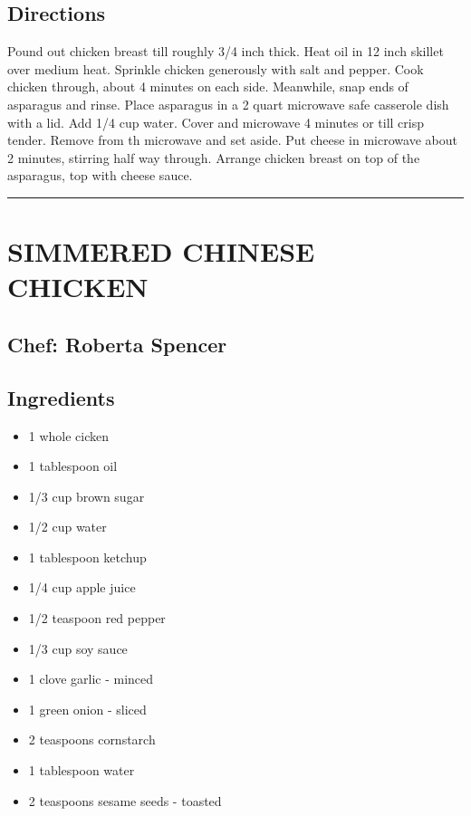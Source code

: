 \documentclass[
]{book}
\providecommand{\tightlist}{%
  \setlength{\itemsep}{0pt}\setlength{\parskip}{0pt}}
\begin{document}
\hypertarget{directions-64}{%
\subsection*{Directions}\label{directions-64}}


Pound out chicken breast till roughly 3/4 inch thick. Heat oil in 12 inch skillet over medium heat. Sprinkle chicken generously with salt and pepper. Cook chicken through, about 4 minutes on each side. Meanwhile, snap ends of asparagus and rinse. Place asparagus in a 2 quart microwave safe casserole dish with a lid. Add 1/4 cup water. Cover and microwave 4 minutes or till crisp tender. Remove from th microwave and set aside. Put cheese in microwave about 2 minutes, stirring half way through. Arrange chicken breast on top of the asparagus, top with cheese sauce.

\begin{center}\rule{0.5\linewidth}{0.5pt}\end{center}

\hypertarget{simmered-chinese-chicken}{%
\section*{SIMMERED CHINESE CHICKEN}\label{simmered-chinese-chicken}}


\hypertarget{chef-roberta-spencer-22}{%
\subsection*{Chef: Roberta Spencer}\label{chef-roberta-spencer-22}}


\hypertarget{ingredients-65}{%
\subsection*{Ingredients}\label{ingredients-65}}


\begin{itemize}
\tightlist
\item
  1 whole cicken
\item
  1 tablespoon oil
\item
  1/3 cup brown sugar
\item
  1/2 cup water
\item
  1 tablespoon ketchup
\item
  1/4 cup apple juice
\item
  1/2 teaspoon red pepper
\item
  1/3 cup soy sauce
\item
  1 clove garlic - minced
\item
  1 green onion - sliced
\item
  2 teaspoons cornstarch
\item
  1 tablespoon water
\item
  2 teaspoons sesame seeds - toasted
\end{itemize}
\end{document}
